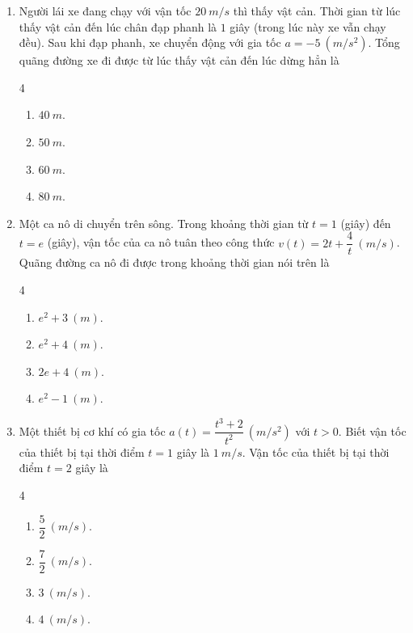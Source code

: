 \documentclass[12pt]{article}
\begin{document}
\begin{enumerate}[label=\textbf{Câu \arabic*.}]
		\item Người lái xe đang chạy với vận tốc $20 \ m/s$ thì thấy vật cản. Thời gian từ lúc thấy vật cản đến lúc chân đạp phanh là $1$ giây (trong lúc này xe vẫn chạy đều). Sau khi đạp phanh, xe chuyển động với gia tốc $a = -5 \ (m/s^2)$. Tổng quãng đường xe đi được từ lúc thấy vật cản đến lúc dừng hẳn là
		\begin{multicols}{4}
			\begin{enumerate}[label=\textbf{\Alph*.}]
				\item $40 \ m$.
				\item $50 \ m$.
				\item $60 \ m$.
				\item $80 \ m$.
			\end{enumerate}
		\end{multicols}
		
		\item Một ca nô di chuyển trên sông. Trong khoảng thời gian từ $t = 1$ (giây) đến $t = e$ (giây), vận tốc của ca nô tuân theo công thức $v(t) = 2t + \dfrac{4}{t} \ (m/s)$. Quãng đường ca nô đi được trong khoảng thời gian nói trên là
		\begin{multicols}{4}
			\begin{enumerate}[label=\textbf{\Alph*.}]
				\item $e^2 + 3 \ (m)$.
				\item $e^2 + 4 \ (m)$.
				\item $2e + 4 \ (m)$.
				\item $e^2 - 1 \ (m)$.
			\end{enumerate}
		\end{multicols}
		
		\item Một thiết bị cơ khí có gia tốc $a(t) = \dfrac{t^3 + 2}{t^2} \ (m/s^2)$ với $t > 0$. Biết vận tốc của thiết bị tại thời điểm $t = 1$ giây là $1 \ m/s$. Vận tốc của thiết bị tại thời điểm $t = 2$ giây là
		\begin{multicols}{4}
			\begin{enumerate}[label=\textbf{\Alph*.}]
				\item $\dfrac{5}{2} \ (m/s)$.
				\item $\dfrac{7}{2} \ (m/s)$.
				\item $3 \ (m/s)$.
				\item $4 \ (m/s)$.
			\end{enumerate}
		\end{multicols}
		

\end{enumerate}
\end{document}
